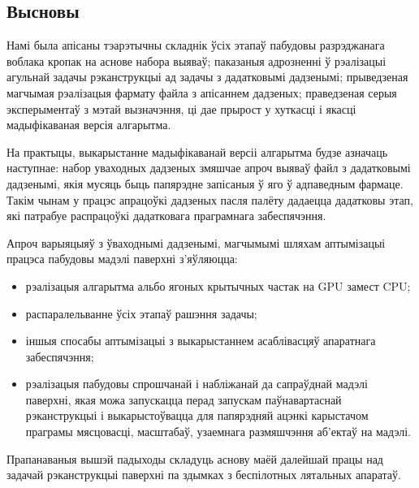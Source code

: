 \begin{center}
    \section*{Высновы}    
\end{center}

Намі была апісаны тэарэтычны складнік ўсіх этапаў пабудовы разрэджанага воблака кропак на аснове набора выяваў; паказаныя адрозненні ў рэалізацыі агульнай задачы рэканструкцыі ад задачы з дадатковымі дадзенымі; прыведзеная магчымая рэалізацыя фармату файла з апісаннем дадзеных; праведзеная серыя эксперыментаў з мэтай вызначэння, ці дае прырост у хуткасці і якасці мадыфікаваная версія алгарытма.\par
На практыцы, выкарыстанне мадыфікаванай версіі алгарытма будзе азначаць наступнае: набор уваходных дадзеных змяшчае апроч выяваў файл з дадатковымі дадзенымі, якія мусяць быць папярэдне запісаныя ў яго ў адпаведным фармаце. Такім чынам у працэс апрацоўкі дадзеных пасля палёту дадаецца дадатковы этап, які патрабуе распрацоўкі дадатковага праграмнага забеспячэння.\par
Апроч варыяцыяў з ўваходнымі дадзенымі, магчымымі шляхам аптымізацыі працэса пабудовы мадэлі паверхні з'яўляюцца:
\begin{itemize}
    \item рэалізацыя алгарытма альбо ягоных крытычных частак на GPU замест CPU; 
    \item распаралельванне ўсіх этапаў рашэння задачы;
    \item іншыя спосабы аптымізацыі з выкарыстаннем асаблівасцяў апаратнага забеспячэння;
    \item рэалізацыя пабудовы спрошчанай і набліжанай да сапраўднай мадэлі паверхні, якая можа запускацца перад запускам паўнавартаснай рэканструкцыі і выкарыстоўвацца для папярэдняй ацэнкі карыстачом праграмы мясцовасці, масштабаў, узаемнага размяшчэння аб'ектаў на мадэлі.
\end{itemize}

Прапанаваныя вышэй падыходы складуць аснову маёй далейшай працы над задачай рэканструкцыі паверхні па здымках з беспілотных лятальных апаратаў.

\newpage